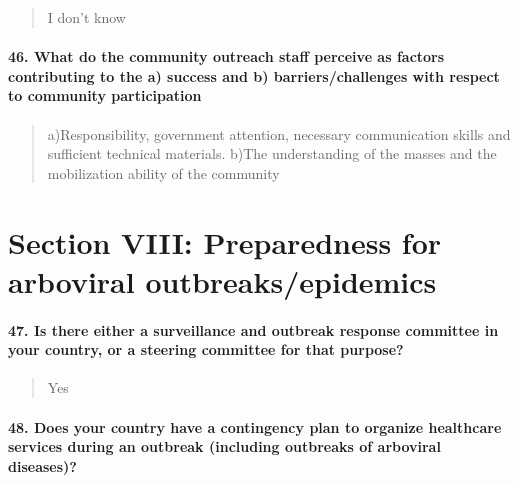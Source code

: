 \documentclass[
]{article}
\begin{document}
\begin{quote}
I don't know
\end{quote}

\hypertarget{what-do-the-community-outreach-staff-perceive-as-factors-contributing-to-the-a-success-and-b-barrierschallenges-with-respect-to-community-participation}{%
\paragraph{46. What do the community outreach staff perceive as factors
contributing to the a) success and b) barriers/challenges with respect
to community
participation}\label{what-do-the-community-outreach-staff-perceive-as-factors-contributing-to-the-a-success-and-b-barrierschallenges-with-respect-to-community-participation}}

\begin{quote}
a)Responsibility, government attention, necessary communication skills
and sufficient technical materials. b)The understanding of the masses
and the mobilization ability of the community
\end{quote}

\hypertarget{section-viii-preparedness-for-arboviral-outbreaksepidemics}{%
\section{Section VIII: Preparedness for arboviral
outbreaks/epidemics}\label{section-viii-preparedness-for-arboviral-outbreaksepidemics}}

\hypertarget{is-there-either-a-surveillance-and-outbreak-response-committee-in-your-country-or-a-steering-committee-for-that-purpose}{%
\paragraph{47. Is there either a surveillance and outbreak response
committee in your country, or a steering committee for that
purpose?}\label{is-there-either-a-surveillance-and-outbreak-response-committee-in-your-country-or-a-steering-committee-for-that-purpose}}

\begin{quote}
Yes
\end{quote}

\hypertarget{does-your-country-have-a-contingency-plan-to-organize-healthcare-services-during-an-outbreak-including-outbreaks-of-arboviral-diseases}{%
\paragraph{48. Does your country have a contingency plan to organize
healthcare services during an outbreak (including outbreaks of arboviral
diseases)?}\label{does-your-country-have-a-contingency-plan-to-organize-healthcare-services-during-an-outbreak-including-outbreaks-of-arboviral-diseases}}
\end{document}

